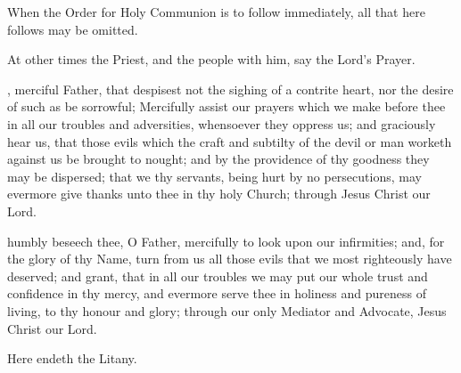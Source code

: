 \begin{rubric}
When the Order for Holy Communion is to follow immediately, all that here follows may be omitted.
\end{rubric}
\begin{rubric}
At other times the Priest, and the people with him, say the Lord's Prayer.
\end{rubric}





, merciful Father, that despisest not the sighing of a contrite heart, nor the desire of such as be sorrowful; Mercifully assist our prayers which we make before thee in all our troubles and adversities, whensoever they oppress us; and graciously hear us, that those evils which the craft and subtilty of the devil or man worketh against us be brought to nought; and by the providence of thy goodness they may be dispersed; that we thy servants, being hurt by no persecutions, may evermore give thanks unto thee in thy holy Church; through Jesus Christ our Lord.



 humbly beseech thee, O Father, mercifully to look upon our infirmities; and, for the glory of thy Name, turn from us all those evils that we most righteously have deserved; and grant, that in all our troubles we may put our whole trust and confidence in thy mercy, and evermore serve thee in holiness and pureness of living, to thy honour and glory; through our only Mediator and Advocate, Jesus Christ our Lord.



\begin{rubric}
Here endeth the Litany.
\end{rubric}

\clearpage
